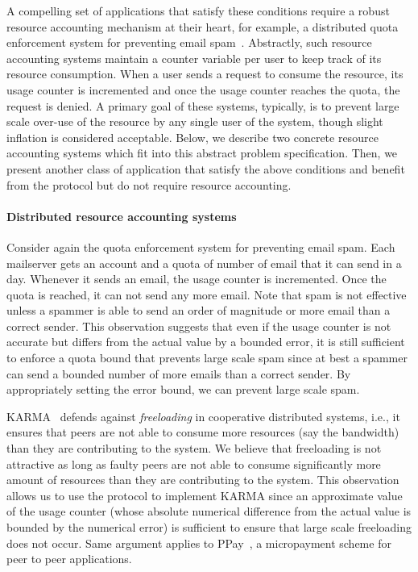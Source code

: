 \documentclass[twocolumn,10pt]{article}
\begin{document}
A compelling set of applications that satisfy these conditions
require a robust resource accounting mechanism at their heart,
for example, a distributed
quota enforcement system for preventing email spam~\cite{Walfish2006}. Abstractly,
such resource accounting systems maintain a counter variable per user to keep track of its 
resource consumption.
When a user sends a request to consume the resource, its usage counter is 
incremented and once the usage counter reaches the quota, the request is denied. A primary goal of these systems,
typically,
is to prevent large scale over-use of the resource by any single user of the system, though
slight inflation is considered acceptable. Below, we describe two concrete resource accounting
systems which fit into this abstract problem specification. Then, we present another class
of application that satisfy the above conditions and benefit from the \Sys protocol but do
not require resource accounting.




\paragraph{Distributed resource accounting systems} Consider again the quota 
enforcement system for 
preventing email spam. Each mailserver gets an account and a quota of number of email that it
can send in a day. Whenever it sends an email, the usage counter is incremented. 
Once the quota is reached, it can not send any more email. Note that spam is not effective 
unless a spammer is able to send an order of magnitude or more email than a correct sender. 
This observation suggests that even if the usage counter is not accurate but differs from the 
actual value by a bounded error, it is still sufficient to enforce a quota bound that prevents 
large scale spam since at best a spammer can send a bounded number of more emails than a correct 
sender. By appropriately setting the error bound, we can prevent large scale spam. 


KARMA~\cite{karma-p2pecon-03} defends against \emph{freeloading} in cooperative
distributed systems, i.e., it ensures
that peers are not able to consume more resources (say the bandwidth) than they
are contributing to the system. We believe that freeloading is not attractive as long as faulty 
peers are not able to consume significantly more amount of resources than they are contributing 
to the system. This observation allows us to use the \Sys protocol to implement KARMA since 
an approximate value of the usage counter (whose absolute
numerical difference from the actual value is bounded by the numerical error) is sufficient to 
ensure that large scale freeloading does not occur. 
Same argument applies to PPay~\cite{ppay-ccs-03}, a micropayment scheme for peer to peer applications.
\end{document}
